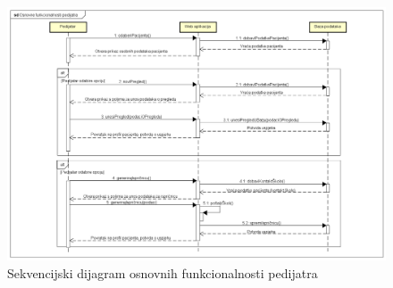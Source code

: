 				\begin{figure}[H]
					\includegraphics[scale=0.4]{dijagrami/pedseq1.PNG} %
					\centering
					\caption{Sekvencijski dijagram osnovnih funkcionalnosti pedijatra}
					\label{fig:seq2}
				\end{figure}
				\clearpage
				

